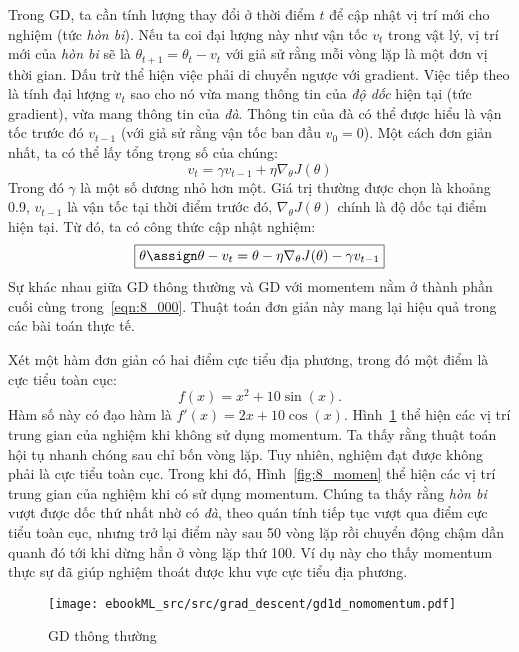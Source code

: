 Trong GD, ta cần tính lượng thay đổi ở thời điểm $t$ để cập nhật vị trí
mới cho nghiệm (tức \textit{hòn bi}). Nếu ta coi đại lượng này như vận tốc
$v_t$ trong vật lý, vị trí mới của \textit{hòn bi} sẽ là $\theta_{t+1} =
\theta_{t} - v_t$ với giả sử rằng mỗi vòng lặp là một đơn vị thời gian. Dấu trừ
thể hiện việc phải di chuyển ngược với gradient. Việc tiếp theo là tính đại lượng
$v_t$ sao cho nó vừa mang thông tin của \textit{độ dốc} hiện tại (tức gradient),
vừa mang thông tin của \textit{đà}. Thông tin của đà có thể được hiểu là vận tốc
trước đó $v_{t-1}$ (với giả sử rằng vận tốc ban đầu $v_0=0$). Một cách đơn giản
nhất, ta có thể lấy tổng trọng số của chúng:
\begin{equation}
\boxed{v_{t}= \gamma v_{t-1} + \eta \nabla_{\theta}J(\theta)}
\end{equation}
Trong đó $\gamma$ là một số dương nhỏ hơn một. Giá trị thường được chọn là khoảng 0.9, $v_{t-1}$ là vận tốc tại thời điểm trước đó, $ \nabla_{\theta}J(\theta)$ chính là độ dốc tại điểm hiện tại. Từ đó, ta có công thức cập nhật nghiệm:
\begin{equation}
\label{eqn:8_000}
\boxed{\theta \assign \theta - v_t = \theta  - \eta \nabla_{\theta}J(\theta)- \gamma
v_{t-1}}
\end{equation}
Sự khác nhau giữa GD thông thường và GD với momentem nằm ở thành phần cuối
cùng trong~\eqref{eqn:8_000}. Thuật toán đơn giản này mang lại hiệu quả trong
các bài toán thực tế. %

Xét một hàm đơn giản có hai
điểm cực tiểu địa phương, trong đó một điểm là cực tiểu toàn cục:
\begin{equation}
f(x) = x^2 + 10\sin(x).
\end{equation}
Hàm số này có đạo hàm là $f'(x) = 2x + 10\cos(x)$. Hình~\ref{fig:8_nomomen} thể
hiện các vị trí trung gian của nghiệm khi không sử dụng momentum. Ta thấy rằng
thuật toán hội tụ nhanh chóng sau chỉ bốn vòng lặp. Tuy nhiên, nghiệm đạt được
không phải là cực tiểu toàn cục. Trong khi đó, Hình~\ref{fig:8_momen} thể hiện các
vị trí trung gian của nghiệm khi có sử dụng momentum. Chúng ta thấy rằng
\textit{hòn bi} vượt được dốc thứ nhất nhờ có \textit{đà}, theo quán tính tiếp
tục vượt qua điểm cực tiểu toàn cục, nhưng trở lại điểm này sau 50 vòng lặp
rồi chuyển động chậm dần quanh đó tới khi dừng hẳn ở vòng lặp thứ 100. Ví dụ này
cho thấy momentum thực sự đã giúp nghiệm thoát được khu vực cực tiểu địa phương.

\begin{figure}[t]
\centering
\texttt{[image: ebookML\_src/src/grad\_descent/gd1d\_nomomentum.pdf]}
\caption[]{GD thông thường}
\label{fig:8_nomomen}
\end{figure}

